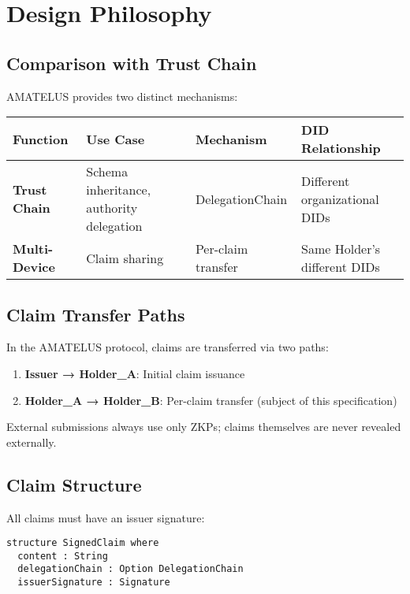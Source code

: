\section{Design Philosophy}

\subsection{Comparison with Trust Chain}

AMATELUS provides two distinct mechanisms:

\begin{table}[H]
\centering
\begin{tabular}{|l|l|l|l|}
\hline
\textbf{Function} & \textbf{Use Case} & \textbf{Mechanism} & \textbf{DID Relationship} \\
\hline
\textbf{Trust Chain} & Schema inheritance, authority delegation & DelegationChain & Different organizational DIDs \\
\hline
\textbf{Multi-Device} & Claim sharing & Per-claim transfer & Same Holder's different DIDs \\
\hline
\end{tabular}
\end{table}

\subsection{Claim Transfer Paths}

In the AMATELUS protocol, claims are transferred via two paths:

\begin{enumerate}
  \item \textbf{Issuer → Holder\_A}: Initial claim issuance
  \item \textbf{Holder\_A → Holder\_B}: Per-claim transfer (subject of this specification)
\end{enumerate}

External submissions always use only ZKPs; claims themselves are never revealed externally.

\subsection{Claim Structure}

All claims must have an issuer signature:

\begin{verbatim}
structure SignedClaim where
  content : String
  delegationChain : Option DelegationChain
  issuerSignature : Signature
\end{verbatim}

